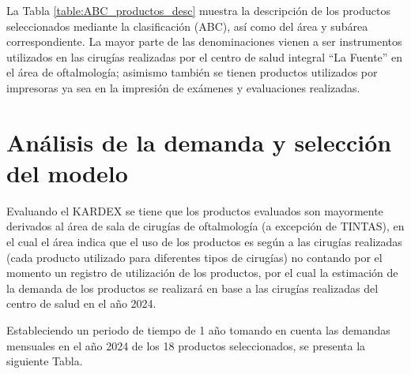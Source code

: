 La Tabla \ref{table:ABC_productos_desc} muestra la descripción de los productos seleccionados mediante la clasificación (ABC), así como del área y subárea correspondiente. La mayor parte de las denominaciones vienen a ser instrumentos utilizados en las cirugías realizadas por el centro de salud integral ``La Fuente'' en el área de oftalmología; asimismo también se tienen productos utilizados por impresoras ya sea en la impresión de exámenes y evaluaciones realizadas.  

\section{Análisis de la demanda y selección del modelo}

Evaluando el KARDEX se tiene que los productos evaluados son mayormente derivados al área de sala de cirugías de oftalmología (a excepción de TINTAS), en el cual el área indica que el uso de los productos es según a las cirugías realizadas (cada producto utilizado para diferentes tipos de cirugías) no contando por el momento un registro de utilización de los productos, por el cual la estimación de la demanda de los productos se realizará en base a las cirugías realizadas del centro de salud en el año 2024.

Estableciendo un periodo de tiempo de 1 año tomando en cuenta las demandas mensuales en el año 2024 de los 18 productos seleccionados, se presenta la siguiente Tabla.

